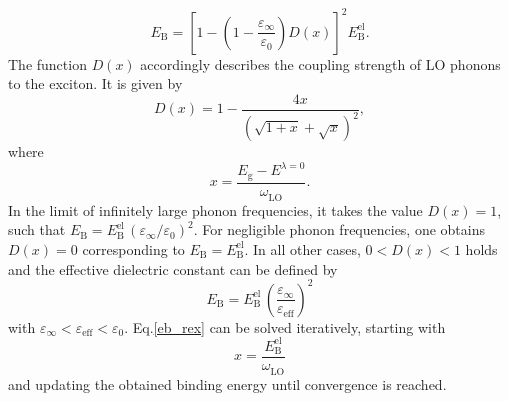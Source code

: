 \begin{equation}\label{eb_rex}
    E_\text{B}^{\phantom{l}} = \left[1 - \left(1-\frac{\varepsilon_\infty}{\varepsilon_0}\right)D(x)\right]^2E^\text{el}_\text{B}.
\end{equation}
%
The function $D(x)$ accordingly describes the coupling strength of LO phonons to the exciton. It is given by
%
\begin{equation}
    D(x)  = 1 - \frac{4x}{(\sqrt{1 + x} + \sqrt{x})^2},
\end{equation}
where
 \begin{equation}
     x  = \frac{E_\text{g} - E^{\lambda=0}}{\omega^{\phantom{I}}_\text{LO}}.
\end{equation}
%
 In the limit of infinitely large phonon frequencies, it takes the value $D(x) = 1$, such that $ E_\text{B}^{\phantom{l}} = E^\text{el}_\text{B}\,(\varepsilon_\infty/\varepsilon_0)^2 $. For negligible phonon frequencies, one obtains   $D(x) = 0$ 
 \newpage
 corresponding to $ E_\text{B}^{\phantom{l}} = E^\text{el}_\text{B}$. In all other cases,  $0 < D(x) < 1$ holds and the effective dielectric constant can be defined by  
%
\begin{equation}\label{eps_eff}
E_\text{B}^{\phantom{l}} = E^\text{el}_\text{B}\,\left(\frac{\varepsilon_\infty}{\varepsilon_\text{eff}}\right)^{\!\!2} 
\end{equation}
with $ \varepsilon_\infty < \varepsilon_\text{eff} < \varepsilon_0$.  Eq.\;\eqref{eb_rex} can be solved iteratively, starting with  
%
\begin{equation}
    x= \frac{E^\text{el}_\text{B}}{\omega^{\phantom{I}}_\text{LO}}
\end{equation}
%
and updating the obtained binding energy until convergence is reached. 









